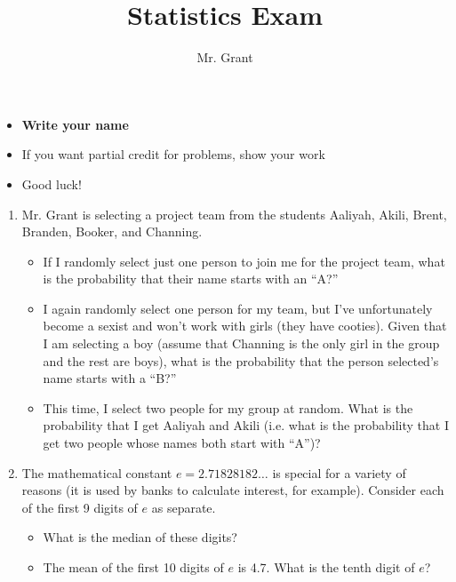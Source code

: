 \documentclass[12pt]{article}
\begin{document}
\title{Statistics Exam}
\author{Mr. Grant}
\maketitle

\begin{itemize}
	\item \textbf{Write your name}
	\item If you want partial credit for problems, show your work
	\item Good luck!
\end{itemize}

\begin{enumerate}

	\item Mr. Grant is selecting a project team from the students Aaliyah, Akili, Brent, Branden, Booker, and Channing.
	\begin{itemize}
		\item If I randomly select just one person to join me for the project team, what is the probability that their name starts with an ``A?'' \vspace{10mm}
		\item I again randomly select one person for my team, but I've unfortunately become a sexist and won't work with girls (they have cooties). Given that I am selecting a boy (assume that Channing is the only girl in the group and the rest are boys), what is the probability that the person selected's name starts with a ``B?'' \vspace{10mm}
		\item This time, I select two people for my group at random. What is the probability that I get Aaliyah and Akili (i.e. what is the probability that I get two people whose names both start with ``A'')? \vspace{15mm}
	\end{itemize}

	\item The mathematical constant $e = 2.71828182 \ldots$ is special for a variety of reasons (it is used by banks to calculate interest, for example). Consider each of the first 9 digits of $e$ as separate.
	\begin{itemize}
		\item What is the median of these digits? \vspace{10mm}
		\item The mean of the first 10 digits of $e$ is 4.7. What is the tenth digit of $e$? \vspace{10mm}
	\end{itemize}


\end{enumerate}
\end{document}
